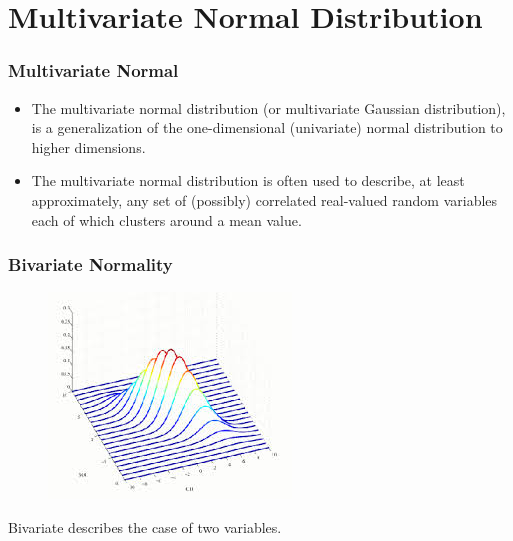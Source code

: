\documentclass{beamer}
\begin{document}
	\section{Multivariate Normal Distribution}
	
\begin{frame}[fragile]
	\frametitle{Multivariate Normal}
	{\Large
		\begin{itemize}
			\item The multivariate normal distribution (or multivariate Gaussian distribution), is a generalization of the one-dimensional (univariate) normal distribution to higher dimensions.
			\item The multivariate normal distribution is often used to describe, at least approximately, any set of (possibly) correlated real-valued random variables each of which clusters around a mean value.
		\end{itemize}
	}
\end{frame}
\begin{frame}
\frametitle{Bivariate Normality}
	\begin{figure}
		\centering
		\includegraphics[width=0.7\linewidth]{BivariateNormal1}
	\end{figure}
Bivariate describes the case of two variables.
\end{frame}
\end{document}
